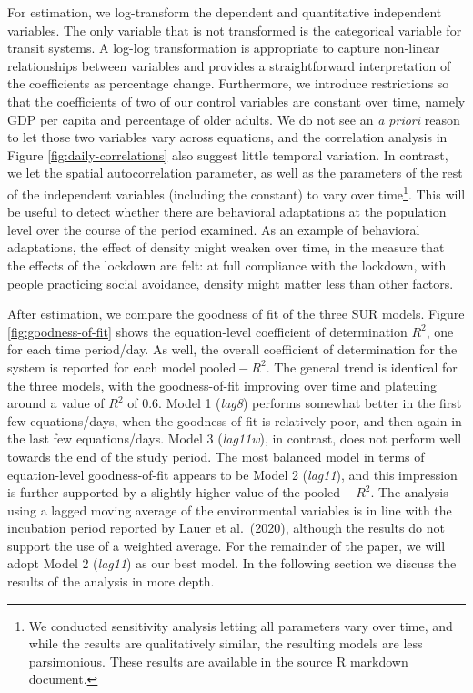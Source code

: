 \documentclass[]{elsarticle} %
\begin{document}
For estimation, we log-transform the dependent and quantitative
independent variables. The only variable that is not transformed is the
categorical variable for transit systems. A log-log transformation is
appropriate to capture non-linear relationships between variables and
provides a straightforward interpretation of the coefficients as
percentage change. Furthermore, we introduce restrictions so that the
coefficients of two of our control variables are constant over time,
namely GDP per capita and percentage of older adults. We do not see an
\emph{a priori} reason to let those two variables vary across equations,
and the correlation analysis in Figure \ref{fig:daily-correlations} also
suggest little temporal variation. In contrast, we let the spatial
autocorrelation parameter, as well as the parameters of the rest of the
independent variables (including the constant) to vary over
time\footnote{We conducted sensitivity analysis letting all parameters vary over time, and while the results are qualitatively similar, the resulting models are less parsimonious. These results are available in the source R markdown document.}.
This will be useful to detect whether there are behavioral adaptations
at the population level over the course of the period examined. As an
example of behavioral adaptations, the effect of density might weaken
over time, in the measure that the effects of the lockdown are felt: at
full compliance with the lockdown, with people practicing social
avoidance, density might matter less than other factors.

After estimation, we compare the goodness of fit of the three SUR
models. Figure \ref{fig:goodness-of-fit} shows the equation-level
coefficient of determination \(R^2\), one for each time period/day. As
well, the overall coefficient of determination for the system is
reported for each model \(\text{pooled}-R^2\). The general trend is
identical for the three models, with the goodness-of-fit improving over
time and plateuing around a value of \(R^2\) of 0.6. Model 1
(\emph{lag8}) performs somewhat better in the first few equations/days,
when the goodness-of-fit is relatively poor, and then again in the last
few equations/days. Model 3 (\emph{lag11w}), in contrast, does not
perform well towards the end of the study period. The most balanced
model in terms of equation-level goodness-of-fit appears to be Model 2
(\emph{lag11}), and this impression is further supported by a slightly
higher value of the \(\text{pooled}-R^2\). The analysis using a lagged
moving average of the environmental variables is in line with the
incubation period reported by Lauer et al.~(2020), although the results
do not support the use of a weighted average. For the remainder of the
paper, we will adopt Model 2 (\emph{lag11}) as our best model. In the
following section we discuss the results of the analysis in more depth.
\end{document}
